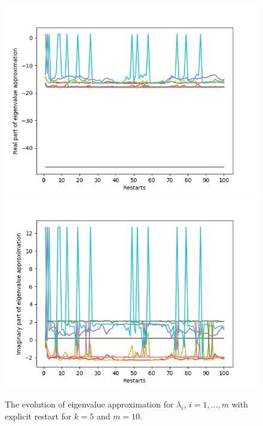 \begin{figure}[h!]
\centering
\includegraphics[scale=0.4]{../task7/task7a1_k5m10.png}
\includegraphics[scale=0.4]{../task7/task7a2_k5m10.png}
\caption{The evolution of eigenvalue approximation for $\lambda_{i}$, $i = 1,\ldots,m$ with explicit restart for $k = 5$ and $m=10$.}
\label{fig:task7a1k5}
\end{figure}


